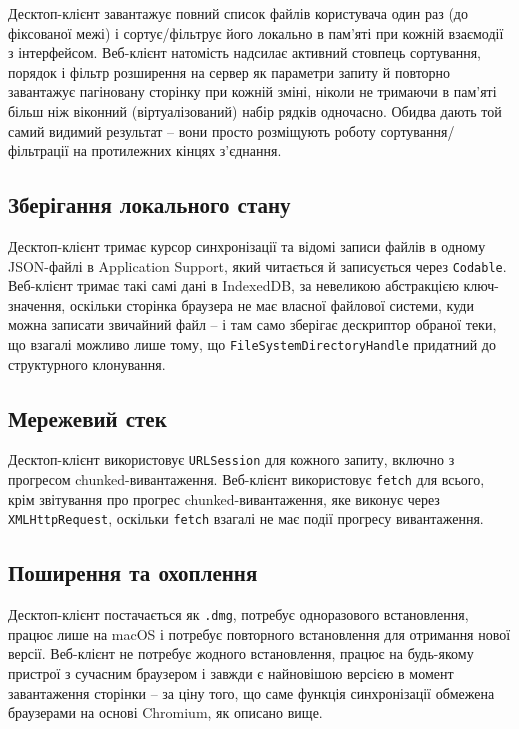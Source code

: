 \documentclass[12pt,a4paper]{article}
\begin{document}
Десктоп-клієнт завантажує повний список файлів користувача один раз (до фіксованої межі) і сортує/фільтрує його локально в пам'яті при кожній взаємодії з інтерфейсом. Веб-клієнт натомість надсилає активний стовпець сортування, порядок і фільтр розширення на сервер як параметри запиту й повторно завантажує пагіновану сторінку при кожній зміні, ніколи не тримаючи в пам'яті більш ніж віконний (віртуалізований) набір рядків одночасно. Обидва дають той самий видимий результат -- вони просто розміщують роботу сортування/фільтрації на протилежних кінцях з'єднання.

\subsection{Зберігання локального стану}

Десктоп-клієнт тримає курсор синхронізації та відомі записи файлів в одному JSON-файлі в Application Support, який читається й записується через \texttt{Codable}. Веб-клієнт тримає такі самі дані в IndexedDB, за невеликою абстракцією ключ-значення, оскільки сторінка браузера не має власної файлової системи, куди можна записати звичайний файл -- і там само зберігає дескриптор обраної теки, що взагалі можливо лише тому, що \texttt{FileSystemDirectoryHandle} придатний до структурного клонування.

\subsection{Мережевий стек}

Десктоп-клієнт використовує \texttt{URLSession} для кожного запиту, включно з прогресом chunked-вивантаження. Веб-клієнт використовує \texttt{fetch} для всього, крім звітування про прогрес chunked-вивантаження, яке виконує через \texttt{XMLHttpRequest}, оскільки \texttt{fetch} взагалі не має події прогресу вивантаження.

\subsection{Поширення та охоплення}

Десктоп-клієнт постачається як \texttt{.dmg}, потребує одноразового встановлення, працює лише на macOS і потребує повторного встановлення для отримання нової версії. Веб-клієнт не потребує жодного встановлення, працює на будь-якому пристрої з сучасним браузером і завжди є найновішою версією в момент завантаження сторінки -- за ціну того, що саме функція синхронізації обмежена браузерами на основі Chromium, як описано вище.
\end{document}

